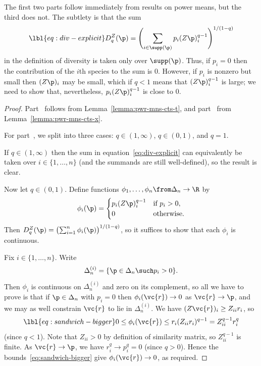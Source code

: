 The first two parts follow immediately from results on power means, but the
third does not.  The subtlety is that the sum
% 
\begin{equation}
\lbl{eq:div-explicit}
D_q^Z(\p)
=
\Biggl( 
\sum_{i \in \supp(\p)} p_i (Z\p)_i^{q - 1} 
\Biggr)^{1/(1 - q)}
\end{equation}
% 
in the definition of diversity is taken only over $\supp(\p)$.  Thus, if
$p_i = 0$ then the contribution of the $i$th species to the sum is $0$.
However, if $p_i$ is nonzero but small then $(Z\p)_i$ may be small, which
if $q < 1$ means that $(Z\p)_i^{q - 1}$ is large; we need to show that,
nevertheless, $p_i(Z\p)_i^{q - 1}$ is close to $0$.

\begin{proof}
Part~ follows from Lemma~\ref{lemma:pwr-mns-cts-t}, and
part~ from Lemma~\ref{lemma:pwr-mns-cts-x}.  

For part~, we split into three cases: $q \in (1,
\infty)$, $q \in (0, 1)$, and $q = 1$.

If $q \in (1, \infty)$ then the sum in equation~\eqref{eq:div-explicit} can
equivalently be taken over $i \in \{1, \ldots, n\}$ (and the summands are
still well-defined), so the result is clear.

Now let $q \in (0, 1)$.  Define functions $\phi_1, \ldots, \phi_n \from
\Delta_n \to \R$ by
\[
\phi_i(\p) =
\begin{cases}
p_i (Z\p)_i^{q - 1}     &\text{if } p_i > 0,    \\
0                       &\text{otherwise}.
\end{cases}
\]
Then $D_q^Z(\p) = \bigl( \sum_{i = 1}^n \phi_i(\p) \bigr)^{1/(1 - q)}$, so
it suffices to show that each $\phi_i$ is continuous.

Fix $i \in \{1, \ldots, n\}$.  Write
\[
\Delta_n^{(i)} 
=
\{ \p \in \Delta_n \such p_i > 0 \}.
\]
Then $\phi_i$ is continuous on $\Delta_n^{(i)}$ and zero on its
complement, so all we have to prove is that if $\p \in \Delta_n$ with $p_i
= 0$ then $\phi_i(\vc{r}) \to 0$ as $\vc{r} \to \p$, and we may as well
constrain $\vc{r}$ to lie in $\Delta_n^{(i)}$.  We have $(Z\vc{r})_i \geq
Z_{ii} r_i$, so
% 
\begin{equation}
\lbl{eq:sandwich-bigger}
0 
\leq 
\phi_i(\vc{r})
\leq 
r_i (Z_{ii} r_i)^{q - 1}
=
Z_{ii}^{q - 1} r_i^q
\end{equation}
% 
(since $q < 1$).  Note that $Z_{ii} > 0$ by definition of similarity
matrix, so $Z_{ii}^{q - 1}$ is finite.  As $\vc{r} \to \p$, we have $r_i^q
\to p_i^q = 0$ (since $q > 0$).  Hence the
bounds~\eqref{eq:sandwich-bigger} give $\phi_i(\vc{r}) \to 0$, as required.


\end{proof}
